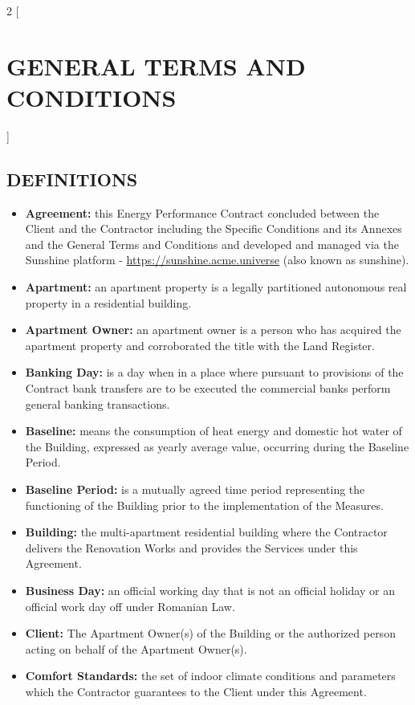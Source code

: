 \begin{multicols}{2}
[\section{GENERAL TERMS AND CONDITIONS}]

\subsection{DEFINITIONS}
\begin{itemize}[label={}]
  	\item\textbf{Agreement:} this Energy Performance Contract concluded between the Client and the Contractor including the Specific Conditions and its Annexes and the General Terms and Conditions and developed and managed via the Sunshine platform - \url{https://sunshine.acme.universe} (also known as sunshine).
	\item\textbf{Apartment:} an apartment property is a legally partitioned autonomous real property in a residential building.
	\item\textbf{Apartment Owner:} an apartment owner is a person who has acquired the apartment property and corroborated the title with the Land Register.
	\item\textbf{Banking Day:} is a day when in a place where pursuant to provisions of the Contract bank transfers are to be executed the commercial banks perform general banking transactions.
	\item\textbf{Baseline:} means the consumption of heat energy and domestic hot water of the Building, expressed as yearly average value, occurring during the Baseline Period.
	\item\textbf{Baseline Period:} is a mutually agreed time period representing the functioning of the Building prior to the implementation of the Measures.
	\item\textbf{Building:} the multi-apartment residential building where the Contractor delivers the Renovation Works and provides the Services under this Agreement.
	\item\textbf{Business Day:} an official working day that is not an official holiday or an official work day off under Romanian Law.
	\item\textbf{Client:} The Apartment Owner(s) of the Building or the authorized person acting on behalf of the Apartment Owner(s).
	\item\textbf{Comfort Standards:} the set of indoor climate conditions and parameters which the Contractor guarantees to the Client under this Agreement.

\end{itemize}
\end{multicols}
